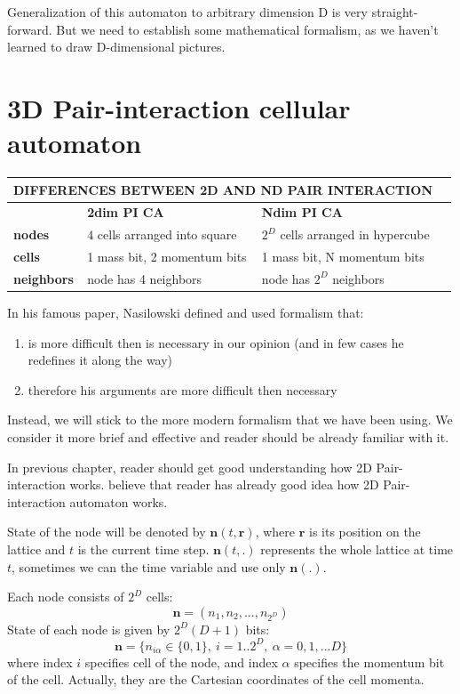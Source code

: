 Generalization of this automaton to arbitrary dimension D is very straight-forward. But we need to establish some mathematical formalism, as we haven't learned to draw D-dimensional pictures.

\section{3D Pair-interaction cellular automaton}

\begin{center}
    \begin{tabular}{| l | l | l | l |}
    \hline
    \multicolumn{3}{|c|}{DIFFERENCES BETWEEN \textbf{2}D AND \textbf{N}D PAIR INTERACTION}\\ \hline
     & \textbf{2dim PI CA} & \textbf{Ndim PI CA} \\ \hline
    \textbf{nodes} & $4$ cells arranged into square & $2^D$ cells arranged in hypercube \\ \hline
    \textbf{cells} & 1 mass bit, 2 momentum bits  & 1 mass bit, N momentum bits \\ \hline
    \textbf{neighbors} & node has 4 neighbors & node has $2^D$ neighbors  \\ \hline
    \end{tabular}
\end{center}

In his famous paper, Nasilowski defined and used formalism that:
\begin{enumerate}
\item is more difficult then is necessary in our opinion (and in few cases he redefines it along the way)
\item therefore his arguments are more difficult then necessary
\end{enumerate}


Instead, we will stick to the more modern formalism that we have been using.
We consider it more brief and effective and reader should be already familiar with it.

In previous chapter, reader should get good understanding how 2D Pair-interaction works.
believe that reader has already good idea how 2D Pair-interaction automaton works.

State of the node will be denoted by $\bm{n}(t,\bm{r})$, where $\bm{r}$ is its position on the lattice and $t$ is the current time step. $\bm{n}(t,.)$ represents the whole lattice at time $t$, sometimes we can the time variable and use only $\bm{n}(.)$.

Each node consists of $2^D$ cells:
\begin{equation}
\bm{n} = (n_1, n_2, ... , n_{2^D})
\end{equation}
State of each node is given by $2^D(D+1)$ bits: 
\begin{equation}
\bm{n} = \big\{ n_{i\alpha} \in \big\{0,1\big\},~i = 1..2^D, ~\alpha = 0,1,...D\big\}
\end{equation}
where index $i$ specifies cell of the node, and index $\alpha$ specifies the momentum bit of the cell. Actually, they are the Cartesian coordinates of the cell momenta.



